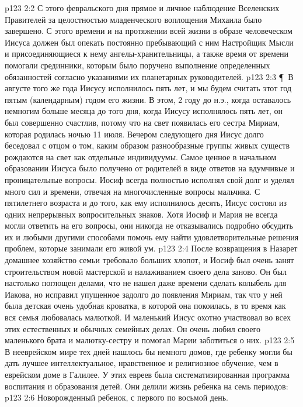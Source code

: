 \vs p123 2:2 С этого февральского дня прямое и личное наблюдение Вселенских Правителей за целостностью младенческого воплощения Михаила было завершено. С этого времени и на протяжении всей жизни в образе человеческом Иисуса должен был опекать постоянно пребывающий с ним Настройщик Мысли и присоединяющиеся к нему ангелы\hyp{}хранительницы, а также время от времени помогали срединники, которым было поручено выполнение определенных обязанностей согласно указаниями их планетарных руководителей.
\vs p123 2:3 \P\ В августе того же года Иисусу исполнилось пять лет, и мы будем считать этот год пятым (календарным) годом его жизни. В этом, 2 году до н.э., когда оставалось немногим больше месяца до того дня, когда Иисусу исполнялось пять лет, он был совершенно счастлив, потому что на свет появилась его сестра Мириам, которая родилась ночью 11 июля. Вечером следующего дня Иисус долго беседовал с отцом о том, каким образом разнообразные группы живых существ рождаются на свет как отдельные индивидуумы. Самое ценное в начальном образовании Иисуса было получено от родителей в виде ответов на вдумчивые и проницательные вопросы. Иосиф всегда полностью исполнял свой долг и уделял много сил и времени, отвечая на многочисленные вопросы мальчика. С пятилетнего возраста и до того, как ему исполнилось десять, Иисус состоял из одних непрерывных вопросительных знаков. Хотя Иосиф и Мария не всегда могли ответить на его вопросы, они никогда не отказывались подробно обсудить их и любыми другими способами помочь ему найти удовлетворительные решения проблем, которые занимали его живой ум.
\vs p123 2:4 После возвращения в Назарет домашнее хозяйство семьи требовало больших хлопот, и Иосиф был очень занят строительством новой мастерской и налаживанием своего дела заново. Он был настолько поглощен делами, что не нашел даже времени сделать колыбель для Иакова, но исправил упущенное задолго до появления Мириам, так что у ней была детская очень удобная кроватка, в которой она покоилась, в то время как вся семья любовалась малюткой. И маленький Иисус охотно участвовал во всех этих естественных и обычных семейных делах. Он очень любил своего маленького брата и малютку\hyp{}сестру и помогал Марии заботиться о них.
\vs p123 2:5 В нееврейском мире тех дней нашлось бы немного домов, где ребенку могли бы дать лучшее интеллектуальное, нравственное и религиозное обучение, чем в еврейском доме в Галилее. У этих евреев была систематизированная программа воспитания и образования детей. Они делили жизнь ребенка на семь периодов:
\vs p123 2:6 \bibnobreakspace Новорожденный ребенок, с первого по восьмой день.
